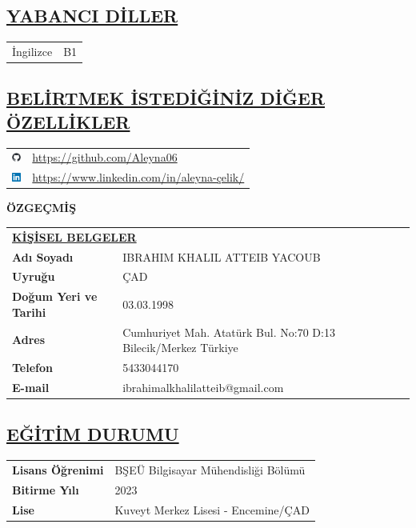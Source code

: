     \subsection*{\underline{\textbf{YABANCI DİLLER}}}
    \begin{tabular}{l@{\bfseries: }l}
    İngilizce & B1 \\
    \end{tabular}
    
    \subsection*{\underline{\textbf{BELİRTMEK İSTEDİĞİNİZ DİĞER ÖZELLİKLER}}}
    \begin{tabular}{l@{}l}
    \href{https://github.com/Aleyna06}{\includegraphics[width=0.3cm]{images/github}} & \href{https://github.com/Aleyna06}{https://github.com/Aleyna06} \\
    \href{https://www.linkedin.com/in/aleyna-çelik/}{\includegraphics[width=0.3cm]{images/linkedIn}} & \href{https://www.linkedin.com/in/aleyna-çelik/}{https://www.linkedin.com/in/aleyna-çelik/} \\
    \end{tabular}
\newpage
\centerline{\textbf{ÖZGEÇMİŞ}}
\begin{table}[H]
\renewcommand{\arraystretch}{1.5}
\begin{tabular}{l@{\bfseries: }l}
\multicolumn{2}{l}{\underline{\textbf{KİŞİSEL BELGELER}}} \\
\textbf{Adı Soyadı} & IBRAHIM KHALIL ATTEIB YACOUB \\
\textbf{Uyruğu} & ÇAD \\
\textbf{Doğum Yeri ve Tarihi} & 03.03.1998 \\
\textbf{Adres} & Cumhuriyet Mah. Atatürk Bul. No:70 D:13 Bilecik/Merkez Türkiye \\
\textbf{Telefon} & 5433044170 \\
\textbf{E-mail} & ibrahimalkhalilatteib@gmail.com \\
\end{tabular}
\end{table}

\subsection*{\underline{\textbf{EĞİTİM DURUMU}}}
\begin{tabular}{l@{\bfseries: }l}
\textbf{Lisans Öğrenimi} & BŞEÜ Bilgisayar Mühendisliği Bölümü \\
\textbf{Bitirme Yılı} & 2023 \\
\textbf{Lise} & Kuveyt Merkez Lisesi - Encemine/ÇAD \\
\end{tabular}

